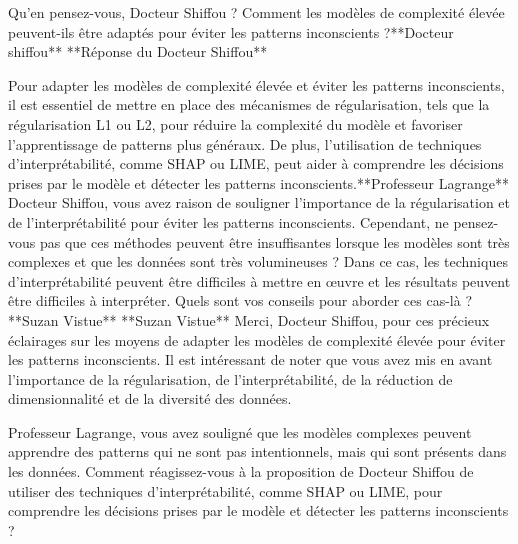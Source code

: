 Qu'en pensez-vous, Docteur Shiffou ? Comment les modèles de complexité élevée peuvent-ils être adaptés pour éviter les patterns inconscients ?**Docteur shiffou**
**Réponse du Docteur Shiffou**

Pour adapter les modèles de complexité élevée et éviter les patterns inconscients, il est essentiel de mettre en place des mécanismes de régularisation, tels que la régularisation L1 ou L2, pour réduire la complexité du modèle et favoriser l'apprentissage de patterns plus généraux. De plus, l'utilisation de techniques d'interprétabilité, comme SHAP ou LIME, peut aider à comprendre les décisions prises par le modèle et détecter les patterns inconscients.**Professeur Lagrange**
Docteur Shiffou, vous avez raison de souligner l'importance de la régularisation et de l'interprétabilité pour éviter les patterns inconscients. Cependant, ne pensez-vous pas que ces méthodes peuvent être insuffisantes lorsque les modèles sont très complexes et que les données sont très volumineuses ? Dans ce cas, les techniques d'interprétabilité peuvent être difficiles à mettre en œuvre et les résultats peuvent être difficiles à interpréter. Quels sont vos conseils pour aborder ces cas-là ?**Suzan Vistue**
**Suzan Vistue**
Merci, Docteur Shiffou, pour ces précieux éclairages sur les moyens de adapter les modèles de complexité élevée pour éviter les patterns inconscients. Il est intéressant de noter que vous avez mis en avant l'importance de la régularisation, de l'interprétabilité, de la réduction de dimensionnalité et de la diversité des données.

Professeur Lagrange, vous avez souligné que les modèles complexes peuvent apprendre des patterns qui ne sont pas intentionnels, mais qui sont présents dans les données. Comment réagissez-vous à la proposition de Docteur Shiffou de utiliser des techniques d'interprétabilité, comme SHAP ou LIME, pour comprendre les décisions prises par le modèle et détecter les patterns inconscients ?

